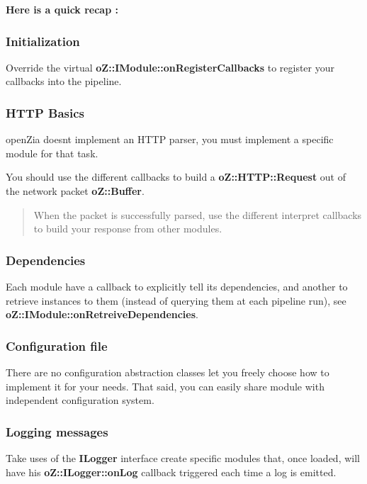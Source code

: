 {\bfseries{Here is a quick recap \+:}}

\subsubsection*{Initialization}

Override the virtual {\bfseries{o\+Z\+::\+I\+Module\+::on\+Register\+Callbacks}} to register your callbacks into the pipeline.

\subsubsection*{H\+T\+TP Basics}

open\+Zia doesn\textquotesingle{}t implement an H\+T\+TP parser, you must implement a specific module for that task.

You should use the different callbacks to build a {\bfseries{o\+Z\+::\+H\+T\+T\+P\+::\+Request}} out of the network packet {\bfseries{o\+Z\+::\+Buffer}}.

\begin{quote}
When the packet is successfully parsed, use the different interpret callbacks to build your response from other modules. \end{quote}


\subsubsection*{Dependencies}

Each module have a callback to explicitly tell its dependencies, and another to retrieve instances to them (instead of querying them at each pipeline run), see {\bfseries{o\+Z\+::\+I\+Module\+::on\+Retreive\+Dependencies}}.

\subsubsection*{Configuration file}

There are no configuration abstraction classes let you freely choose how to implement it for your needs. That said, you can easily share module with independent configuration system.

\subsubsection*{Logging messages}

Take uses of the {\bfseries{I\+Logger}} interface create specific modules that, once loaded, will have his {\bfseries{o\+Z\+::\+I\+Logger\+::on\+Log}} callback triggered each time a log is emitted.

